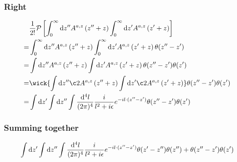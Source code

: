 \documentclass{article}
\DeclarePairedDelimiter\bracketM{[}{]}
\let\bqty\relax
\newcommand{\bqty}[1]{\bracketM*{#1}}
\newcommand{\mm}[1]{\frac{\dd^4#1}{(2\pi)^4}}
\begin{document}
\subsubsection{Right}
\begin{align*}
	& \frac{1}{2!}\mathcal{P} \left[ \int_{0}^{\infty} \dd z^{\prime\prime} A^{a,z}\left(z^{\prime\prime}+z\right) \int_{0}^{\infty} \dd z^{\prime} A^{a,z}\left(z^{\prime}+z\right) \right]                                           \\
	= & \int_{0}^{\infty} \dd z^{\prime\prime} A^{a,z}\left(z^{\prime\prime}+z\right) \int_{0}^{\infty} \dd z^{\prime} A^{a,z}\left(z^{\prime}+z\right)\theta(z''-z')                                                                    \\
	= & \int \dd z^{\prime\prime} A^{a,z}\left(z^{\prime\prime}+z\right) \int \dd z^{\prime} A^{a,z}\left(z^{\prime}+z\right)\theta(z''-z')\theta(z')                                                                    \\
	= & \wick{\int \dd z^{\prime\prime} \c2A^{a,z}\left(z^{\prime\prime}+z\right)\int \dd z^{\prime} \c2 A^{a,z}\left(z^{\prime}+z\right) }
	\theta(z''-z')\theta(z')  \\
	= & \int \dd z^{\prime} \int \dd z^{\prime\prime} \int\mm{l}\frac{i}{l^2+i\epsilon}e^{-il\cdot(z''-z')}
	\theta(z''-z')\theta(z')  \\
\end{align*}
\subsubsection{Summing together}
\begin{align*}
	\int \dd z^{\prime} \int \dd z^{\prime\prime} \int\mm{l}\frac{i}{l^2+i\epsilon}e^{-il\cdot(z''-z')}
	\bqty{\theta(z'-z'')\theta(z'')+\theta(z''-z')\theta(z') }
\end{align*}
\end{document}
